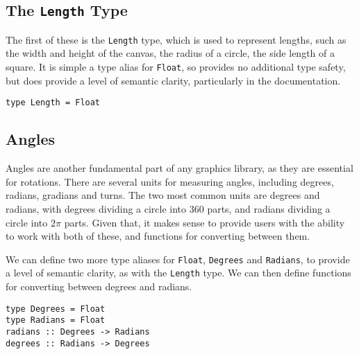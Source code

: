 \documentclass[../main.tex]{subfiles}
\begin{document}
        \subsection{The \texttt{Length}
            Type} The first of these is the \texttt{Length} type, which is used to
                represent lengths, such as the width and height of the canvas, the radius of a
                circle, the side length of a square.
            It is simple a type alias for \texttt{Float}, so provides no additional type
                safety, but does provide a level of semantic clarity, particularly in the
                documentation.
            \begin{lstlisting}[label={lst:length}, caption={The \texttt{Length} type definition.}]
type Length = Float\end{lstlisting}

        \subsection{Angles}
            Angles are another fundamental part of any graphics library, as they are
                essential for rotations.
            There are several units for measuring angles, including degrees, radians,
                gradians and turns.
            The two most common units are degrees and radians, with degrees dividing a
                circle into 360 parts, and radians dividing a circle into $2\pi$ parts.
            Given that, it makes sense to provide users with the ability to work with both
                of these, and functions for converting between them.

            We can define two more type aliases for \texttt{Float}, \texttt{Degrees} and
                \texttt{Radians}, to provide a level of semantic clarity, as with the
                \texttt{Length} type.
            We can then define functions for converting between degrees and radians.

            \begin{lstlisting}[label={lst:angleFns}, caption={The angle functions.}]  
type Degrees = Float
type Radians = Float                
radians :: Degrees -> Radians
degrees :: Radians -> Degrees\end{lstlisting}
\end{document}
